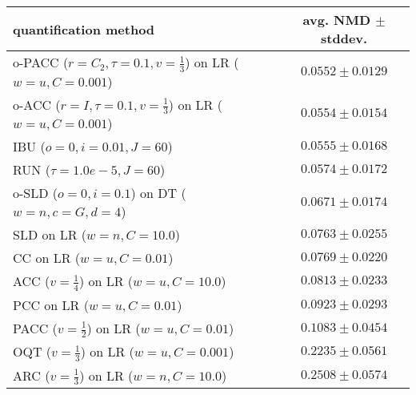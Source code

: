 \begin{tabular}{lc}
  \toprule
  quantification method & avg. NMD $\pm$ stddev. \\
  \midrule
  o-PACC ($r=C_2, \tau=0.1, v=\frac{1}{3}$) on LR ($w=u, C=0.001$) & $\mathbf{0.0552 \pm 0.0129}$ \\
  o-ACC ($r=I, \tau=0.1, v=\frac{1}{3}$) on LR ($w=u, C=0.001$) & $\mathbf{0.0554 \pm 0.0154}$ \\
  IBU ($o=0, i=0.01, J=60$) & $\mathbf{0.0555 \pm 0.0168}$ \\
  RUN ($\tau=1.0e-5, J=60$) & $0.0574 \pm 0.0172$ \\
  o-SLD ($o=0, i=0.1$) on DT ($w=n, c=G, d=4$) & $0.0671 \pm 0.0174$ \\
  SLD on LR ($w=n, C=10.0$) & $0.0763 \pm 0.0255$ \\
  CC on LR ($w=u, C=0.01$) & $0.0769 \pm 0.0220$ \\
  ACC ($v=\frac{1}{4}$) on LR ($w=u, C=10.0$) & $0.0813 \pm 0.0233$ \\
  PCC on LR ($w=u, C=0.01$) & $0.0923 \pm 0.0293$ \\
  PACC ($v=\frac{1}{2}$) on LR ($w=u, C=0.01$) & $0.1083 \pm 0.0454$ \\
  OQT ($v=\frac{1}{3}$) on LR ($w=u, C=0.001$) & $0.2235 \pm 0.0561$ \\
  ARC ($v=\frac{1}{3}$) on LR ($w=n, C=10.0$) & $0.2508 \pm 0.0574$ \\
  \bottomrule
\end{tabular}

